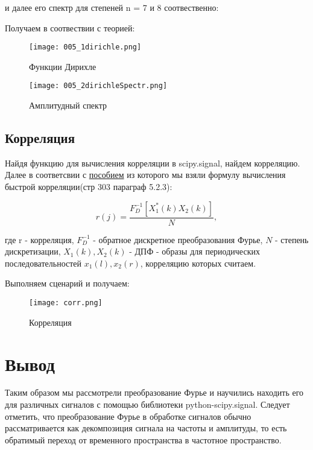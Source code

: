 и далее его  спектр для степеней n = 7 и 8 соотвественно:


\parindent=1cm %

Получаем в соотвествии с теорией:
\begin{figure}[H]
	\begin{center}
		\texttt{[image: 005\_1dirichle.png]}
		\caption{Функции Дирихле} 
		\label{pic:pic09} %
	\end{center}
\end{figure} 

\begin{figure}[H]
	\begin{center}
		\texttt{[image: 005\_2dirichleSpectr.png]}
		\caption{Амплитудный спектр} 
		\label{pic:pic010} %
	\end{center}
\end{figure} 

\subsection{Корреляция}
Найдя функцию для вычисления корреляции в scipy.signal, найдем корреляцию.
Далее в соответсвии с \href{http://www.williamspublishing.com/PDF/5-8459-0710-1/part.pdf}{пособием}
из которого мы взяли формулу вычисления быстрой корреляции(стр 303 параграф 5.2.3):

$$ r(j) = \frac{F_D^{-1}[X_1^*(k)X_2(k)]}{N},  $$

где r - корреляция, $F_D^{-1}$ - обратное   дискретное преобразования Фурье, $N$ - степень дискретизации, $X_1(k), X_2(k)$ - ДПФ - образы для периодических последовательностей $x_1(l), x_2(r)$, корреляцию которых считаем.
  

\parindent=1cm %

Выполняем сценарий и получаем:

\begin{figure}[H]
	\begin{center}
		\texttt{[image: corr.png]}
		\caption{Корреляция} 
		\label{pic:pic011} %
	\end{center}
\end{figure} 


\section{Вывод}
Таким образом мы рассмотрели преобразование Фурье и научились находить его для различных сигналов 
с помощью библиотеки python-scipy.signal. 
Следует отметить, что преобразование Фурье в обработке сигналов обычно рассматривается как декомпозиция 
сигнала на частоты и амплитуды, то есть обратимый переход от временного пространства в частотное пространство.

 


